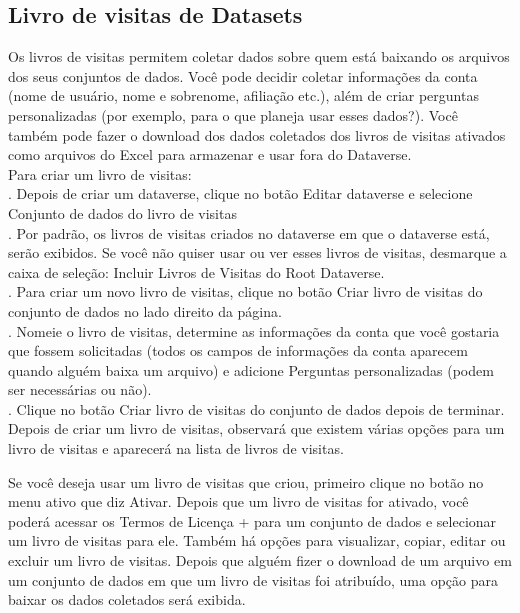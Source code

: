 \documentclass[12pt,hidelinks]{article}
\begin{document}
    \subsection{Livro de visitas de Datasets}
    
\qquad Os livros de visitas permitem coletar dados sobre quem está baixando os arquivos dos seus conjuntos de dados. Você pode decidir coletar informações da conta (nome de usuário, nome e sobrenome, afiliação etc.), além de criar perguntas personalizadas (por exemplo, para o que planeja usar esses dados?). Você também pode fazer o download dos dados coletados dos livros de visitas ativados como arquivos do Excel para armazenar e usar fora do Dataverse.\\

Para criar um livro de visitas:\\

. Depois de criar um dataverse, clique no botão Editar dataverse e selecione Conjunto de dados do livro de visitas\\

. Por padrão, os livros de visitas criados no dataverse em que o dataverse está, serão exibidos. Se você não quiser usar ou ver esses livros de visitas, desmarque a caixa de seleção: Incluir Livros de Visitas do Root Dataverse.\\

. Para criar um novo livro de visitas, clique no botão Criar livro de visitas do conjunto de dados no lado direito da página.\\

. Nomeie o livro de visitas, determine as informações da conta que você gostaria que fossem solicitadas (todos os campos de informações da conta aparecem quando alguém baixa um arquivo) e adicione Perguntas personalizadas (podem ser necessárias ou não).\\

. Clique no botão Criar livro de visitas do conjunto de dados depois de terminar.\\

Depois de criar um livro de visitas, observará que existem várias opções para um livro de visitas e aparecerá na lista de livros de visitas.

Se você deseja usar um livro de visitas que criou, primeiro clique no botão no menu ativo que diz Ativar. Depois que um livro de visitas for ativado, você poderá acessar os Termos de Licença + para um conjunto de dados e selecionar um livro de visitas para ele.
Também há opções para visualizar, copiar, editar ou excluir um livro de visitas.
Depois que alguém fizer o download de um arquivo em um conjunto de dados em que um livro de visitas foi atribuído, uma opção para baixar os dados coletados será exibida.
    
\end{document}
